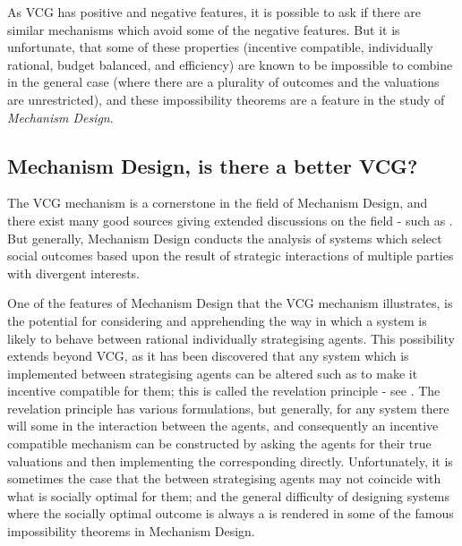 As VCG has positive and negative features, it is possible to ask if there are similar mechanisms which avoid some of the negative features.
But it is unfortunate, that some of these properties (incentive compatible, individually rational, budget balanced, and efficiency) are known to be impossible to combine in the general case (where there are a plurality of outcomes and the valuations are unrestricted), and these impossibility theorems are a feature in the study of \textit{Mechanism Design}.%

\subsection{Mechanism Design, is there a better VCG?}

The VCG mechanism is a cornerstone \DIFdelbegin {}\DIFdelend \DIFaddbegin {}\DIFaddend in the field of Mechanism Design, and there exist many good sources giving extended discussions on the field - such as \cite{37377}.
But generally, Mechanism Design conducts the analysis of systems which select social outcomes based upon the result of strategic interactions of multiple parties with divergent interests.%

One of the features of Mechanism Design that the VCG mechanism illustrates, is the potential for considering and apprehending the way in which a system is likely to behave between rational individually strategising agents.
This possibility extends beyond VCG, as it has been discovered that any system which is implemented between strategising agents can be altered such as to make it incentive compatible for them; this is called the revelation principle - see \cite{RePEc:ecm:emetrp:v:41:y:1973:i:4:p:587-601} \cite[Chapter~2.3]{37377}.
The revelation principle has various formulations, but generally, for any system there will some \DIFdelbegin {}\DIFdelend \DIFaddbegin {}\DIFaddend in the interaction between the agents, and consequently an incentive compatible mechanism can be constructed by asking the agents for their true valuations and then implementing the corresponding \DIFdelbegin {}\DIFdelend \DIFaddbegin {}\DIFaddend directly.
Unfortunately, it is sometimes the case that the \DIFdelbegin {}\DIFdelend \DIFaddbegin {}\DIFaddend between strategising agents may not coincide with what is socially optimal for them; and the general difficulty of designing systems where the socially optimal outcome is always a \DIFdelbegin {}\DIFdelend \DIFaddbegin {}\DIFaddend is rendered in some of the famous impossibility theorems in Mechanism Design. %

